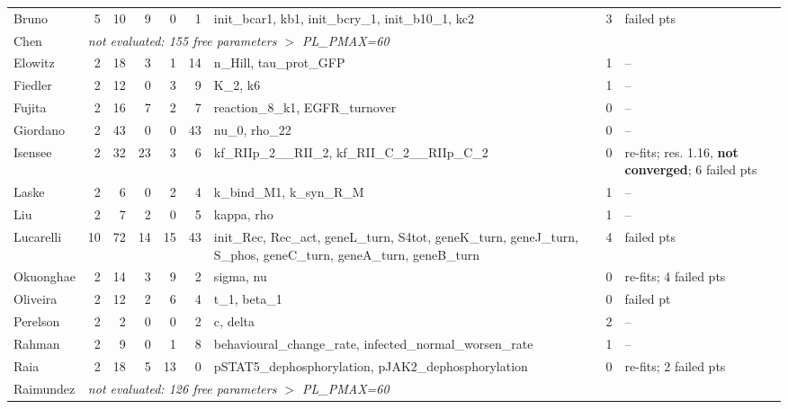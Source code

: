 \begin{longtable}{@{}lrrrrr>{\raggedright}p{2.5cm}r>{\raggedright\arraybackslash}p{2.3cm}@{}}
Bruno & 5 & 10 & 9 & 0 & 1 & init\_\allowbreak{}bcar1, kb1, init\_\allowbreak{}bcry\_\allowbreak{}1, init\_\allowbreak{}b10\_\allowbreak{}1, kc2 & 3 & 2 failed pts \\
Chen & \multicolumn{8}{l}{\emph{not evaluated: 155 free parameters $>$ PL\_\allowbreak{}PMAX=60}} \\
Elowitz & 2 & 18 & 3 & 1 & 14 & n\_\allowbreak{}Hill, tau\_\allowbreak{}prot\_\allowbreak{}GFP & 1 & -- \\
Fiedler & 2 & 12 & 0 & 3 & 9 & K\_\allowbreak{}2, k6 & 1 & -- \\
Fujita & 2 & 16 & 7 & 2 & 7 & reaction\_\allowbreak{}8\_\allowbreak{}k1, EGFR\_\allowbreak{}turnover & 0 & -- \\
Giordano & 2 & 43 & 0 & 0 & 43 & nu\_\allowbreak{}0, rho\_\allowbreak{}22 & 0 & -- \\
Isensee & 2 & 32 & 23 & 3 & 6 & kf\_\allowbreak{}RIIp\_\allowbreak{}2\_\allowbreak{}\_\allowbreak{}RII\_\allowbreak{}2, kf\_\allowbreak{}RII\_\allowbreak{}C\_\allowbreak{}2\_\allowbreak{}\_\allowbreak{}RIIp\_\allowbreak{}C\_\allowbreak{}2 & 0 & 3 re-fits; res. 1.16, \textbf{not converged}; 6 failed pts \\
Laske & 2 & 6 & 0 & 2 & 4 & k\_\allowbreak{}bind\_\allowbreak{}M1, k\_\allowbreak{}syn\_\allowbreak{}R\_\allowbreak{}M & 1 & -- \\
Liu & 2 & 7 & 2 & 0 & 5 & kappa, rho & 1 & -- \\
Lucarelli & 10 & 72 & 14 & 15 & 43 & init\_\allowbreak{}Rec, Rec\_\allowbreak{}act, geneL\_\allowbreak{}turn, S4tot, geneK\_\allowbreak{}turn, geneJ\_\allowbreak{}turn, S\_\allowbreak{}phos, geneC\_\allowbreak{}turn, geneA\_\allowbreak{}turn, geneB\_\allowbreak{}turn & 4 & 2 failed pts \\
Okuonghae & 2 & 14 & 3 & 9 & 2 & sigma, nu & 0 & 2 re-fits; 4 failed pts \\
Oliveira & 2 & 12 & 2 & 6 & 4 & t\_\allowbreak{}1, beta\_\allowbreak{}1 & 0 & 1 failed pt \\
Perelson & 2 & 2 & 0 & 0 & 2 & c, delta & 2 & -- \\
Rahman & 2 & 9 & 0 & 1 & 8 & behavioural\_\allowbreak{}change\_\allowbreak{}rate, infected\_\allowbreak{}normal\_\allowbreak{}worsen\_\allowbreak{}rate & 1 & -- \\
Raia & 2 & 18 & 5 & 13 & 0 & pSTAT5\_\allowbreak{}dephosphorylation, pJAK2\_\allowbreak{}dephosphorylation & 0 & 4 re-fits; 2 failed pts \\
Raimundez & \multicolumn{8}{l}{\emph{not evaluated: 126 free parameters $>$ PL\_\allowbreak{}PMAX=60}} \\

\end{longtable}
